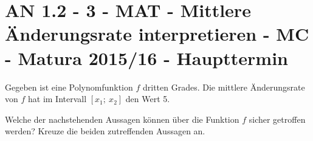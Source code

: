 \section{AN 1.2 - 3 - MAT - Mittlere Änderungsrate interpretieren - MC - Matura 2015/16 - Haupttermin}

\begin{beispiel}[AN 1.2]{1} %
Gegeben ist eine Polynomfunktion $f$ dritten Grades. Die mittlere Änderungsrate von $f$ hat im Intervall $[x_1;~ x_2]$ den Wert 5. \leer

Welche der nachstehenden Aussagen können über die Funktion $f$ sicher getroffen werden?
Kreuze die beiden zutreffenden Aussagen an.

\end{beispiel}